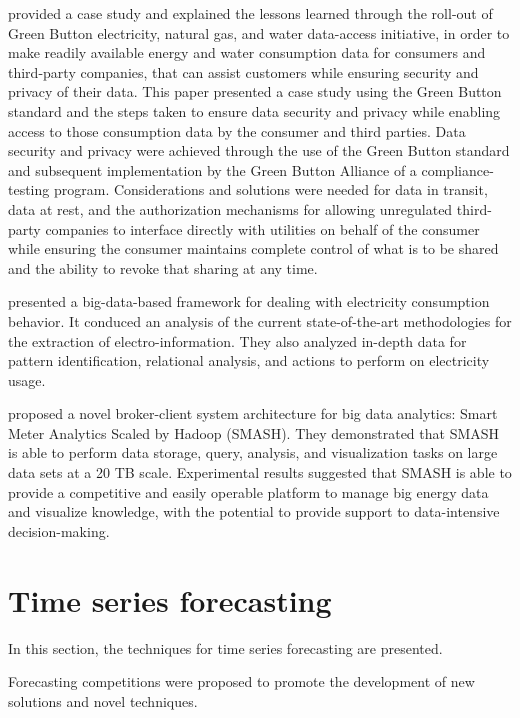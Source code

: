 \cite{Nguyen2019} provided a case study and explained the lessons learned through the roll-out of Green Button electricity, natural gas, and water data-access initiative, in order to make readily available energy and water consumption data for consumers and third-party companies, that can assist customers while ensuring security and privacy of their data.
This paper presented a case study using the Green Button standard and the steps taken to ensure data security and privacy while enabling access to those consumption data by the consumer and third parties.
Data security and privacy were achieved through the use of the Green Button standard and subsequent implementation by the Green Button Alliance of a compliance-testing program.
Considerations and solutions were needed for data in transit, data at rest, and the authorization mechanisms for allowing unregulated third-party companies to interface directly with utilities on behalf of the consumer while ensuring the consumer maintains complete control of what is to be shared and the ability to revoke that sharing at any time.

\cite{8577770} presented a big-data-based framework for dealing with electricity consumption behavior.
It conduced an analysis of the current state-of-the-art methodologies for the extraction of electro-information.
They also analyzed in-depth data for pattern identification, relational analysis, and actions to perform on electricity usage.

\cite{WILCOX2019250} proposed a novel broker-client system architecture for big data analytics: Smart Meter Analytics Scaled by Hadoop (SMASH).
They demonstrated that SMASH is able to perform data storage, query, analysis, and visualization tasks on large data sets at a 20 TB scale.
Experimental results suggested that SMASH is able to provide a competitive and easily operable platform to manage big energy data and visualize knowledge, with the potential to provide support to data-intensive decision-making.


\section{Time series forecasting}
\label{sec:timeseries}
\vspace{0.2 cm}

In this section, the techniques for time series forecasting are presented.

Forecasting competitions were proposed to promote the development of new solutions and novel techniques.
\cite{HYNDMAN20207}
\cite{SPILIOTIS202037}

